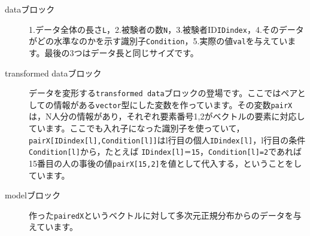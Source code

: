 \begin{description}
	\item[dataブロック] 1.データ全体の長さ\verb|L|，2.被験者の数\verb|N|，3.被験者ID\verb|IDindex|，4.そのデータがどの水準なのかを示す識別子\verb|Condition|，5.実際の値\verb|val|を与えています。最後の3つはデータ長と同じサイズです。
	\item[transformed dataブロック] データを変形する\verb|transformed data|ブロックの登場です。ここではペアとしての情報がある\verb|vector|型にした変数を作っています。その変数\verb|pairX|は，N人分の情報があり，それぞれ要素番号1,2がベクトルの要素に対応しています。ここでも入れ子になった識別子を使っていて，\verb|pairX[IDindex[l],Condition[l]]|はl行目の個人\verb|IDindex[l]|，l行目の条件\verb|Condition[l]|から，たとえば \verb|IDindex[l]＝15|，\verb|Condition[l]=2|であれば15番目の人の事後の値\verb|pairX[15,2]|を値として代入する，ということをしています。
	\item[modelブロック] 作った\verb|pairedX|というベクトルに対して多次元正規分布からのデータを与えています。
\end{description}

